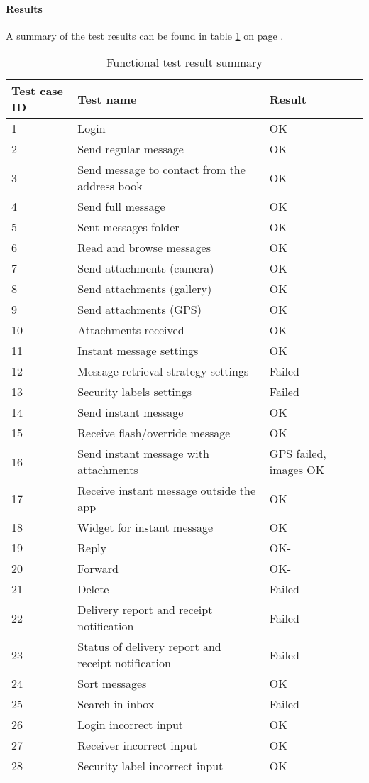 			\paragraph{Results}\hfill
\newline
				A summary of the test results can be found in table \ref{tab:caseresults} on page \pageref{tab:caseresults}.
				\begin{table}[hbt]
\begin{center}
					\begin{tabular}{l|l|l}\hline
						\textbf{Test case ID} & \textbf{Test name} & \textbf{Result} \\ \hline \hline
						1&Login&OK\\
						2&Send regular message&OK\\
						3&Send message to contact from the address book&OK\\
						4&Send full message&OK\\
						5&Sent messages folder&OK\\
						6&Read and browse messages&OK\\
						7&Send attachments (camera)&OK\\
						8&Send attachments (gallery)&OK\\
						9&Send attachments (GPS)&OK\\
						10&Attachments received&OK\\
						11&Instant message settings&OK\\
						12&Message retrieval strategy settings&Failed\\
						13&Security labels settings&Failed\\
						14&Send instant message&OK\\
						15&Receive flash/override message&OK\\
						16&Send instant message with attachments&GPS failed, images OK\\
						17&Receive instant message outside the app&OK\\
						18&Widget for instant message&OK\\
						19&Reply&OK-\\
						20&Forward&OK-\\
						21&Delete&Failed\\
						22&Delivery report and receipt notification&Failed\\
						23&Status of delivery report and receipt notification&Failed\\
						24&Sort messages&OK\\
						25&Search in inbox&Failed\\	
						26&Login incorrect input&OK\\
						27&Receiver incorrect input&OK\\
						28&Security label incorrect input&OK\\ \hline
					\end{tabular}
\end{center}
\caption{Functional test result summary} \label{tab:caseresults}
\end{table}

